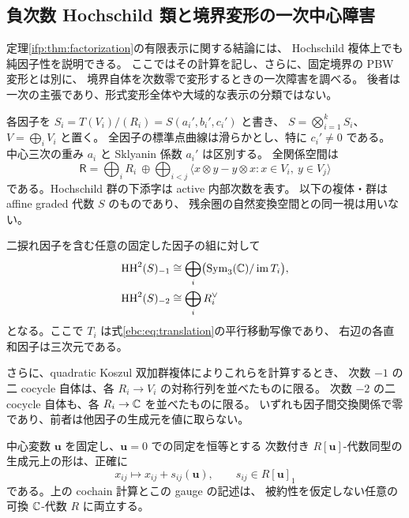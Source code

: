 \subsection{負次数 Hochschild 類と境界変形の一次中心障害}
\label{ifh:subsec:hochschild}

定理\ref{ifp:thm:factorization}の有限表示に関する結論には、
Hochschild 複体上でも純因子性を説明できる。
ここではその計算を記し、さらに、固定境界の PBW 変形とは別に、
境界自体を次数零で変形するときの一次障害を調べる。
後者は一次の主張であり、形式変形全体や大域的な表示の分類ではない。

各因子を $S_i=T(V_i)/(R_i)=S(a_i',b_i',c_i')$ と書き、
$S=\bigotimes_{i=1}^kS_i$、$V=\bigoplus_iV_i$ と置く。
全因子の標準点曲線は滑らかとし、特に $c_i'\ne0$ である。
中心三次の重み $a_i$ と Sklyanin 係数 $a_i'$ は区別する。
全関係空間は
\[
 \mathsf R=\bigoplus_iR_i\ \oplus\!
   \bigoplus_{i<j}\langle x\otimes y-y\otimes x:
                    x\in V_i,\ y\in V_j\rangle
\]
である。Hochschild 群の下添字は active 内部次数を表す。
以下の複体・群は affine graded 代数 $S$ のものであり、
残余圏の自然変換空間との同一視は用いない。

\begin{lemma}
\label{ifh:lem:negative}
二捩れ因子を含む任意の固定した因子の組に対して
\begin{equation}\label{ifh:eq:negative-hh}
 \begin{aligned}
 \operatorname{HH}^2(S)_{-1}
   &\cong\bigoplus_i
      \bigl(\operatorname{Sym}_3(\mathbb C)/\operatorname{im}T_i\bigr),\\
 \operatorname{HH}^2(S)_{-2}
   &\cong\bigoplus_iR_i^\vee
 \end{aligned}
\end{equation}
となる。ここで $T_i$ は式\eqref{ebc:eq:translation}の平行移動写像であり、
右辺の各直和因子は三次元である。

さらに、quadratic Koszul 双加群複体によりこれらを計算するとき、
次数 $-1$ の二 cocycle 自体は、各 $R_i\to V_i$ の対称行列を並べたものに限る。
次数 $-2$ の二 cocycle 自体も、各 $R_i\to\mathbb C$ を並べたものに限る。
いずれも因子間交換関係で零であり、前者は他因子の生成元を値に取らない。

中心変数 $\mathbf u$ を固定し、$\mathbf u=0$ での同定を恒等とする
次数付き $R[\mathbf u]$-代数同型の生成元上の形は、正確に
\begin{equation}\label{ifh:eq:graded-gauge}
 x_{ij}\longmapsto x_{ij}+s_{ij}(\mathbf u),\qquad
              s_{ij}\in R[\mathbf u]_1
\end{equation}
である。上の cochain 計算とこの gauge の記述は、
被約性を仮定しない任意の可換 $\mathbb C$-代数 $R$ に両立する。
\end{lemma}

